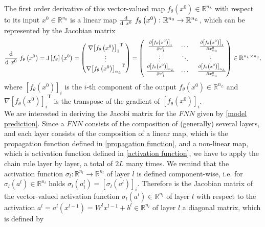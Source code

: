The first order derivative of this vector-valued map $f_{\theta}\left(x^0\right) \in \mathbb{R}^{n_L}$ with respect to its input $x^0 \in \mathbb{R}^{n_0}$ is a linear map $\frac{\textup{d}}{\textup{d} \ x^0} \  f_{\theta}\left(x^0\right) \colon \mathbb{R}^{n_0} \to \mathbb{R}^{n_L}$, which can be represented by the Jacobian matrix
\begin{equation}
    \label{Jacobi}
    \frac{\textup{d}}{\textup{d} \ x^0} \  f_{\theta}\left(x^0\right) = \mathrm{J} \left[f_{\theta} \right]\left(x^0\right) = \begin{pmatrix} \nabla {\left[f_{\theta}\left(x^0\right)\right]_{1}}^{\mathrm{T}} \\ \vdots \\  \nabla {\left[f_{\theta}\left(x^0\right)\right]_{n_L}}^{\mathrm{T}} \end{pmatrix} = \begin{pmatrix} \ \frac{\partial \left[f_{\theta}\left(x^0\right)\right]_1}{\partial x^0_{1}} & \cdots & \ \frac{\partial \left[f_{\theta}\left(x^0\right)\right]_1}{\partial x^0_{n_0}} \\ \vdots & \ddots & \vdots \\ \ \frac{\partial \left[f_{\theta}\left(x^0\right)\right]_{n_L}}{\partial x^0_{1}} & \cdots & \ \frac{\partial \left[f_{\theta}\left(x^0\right)\right]_{n_L}}{\partial x^0_{n_0}} \end{pmatrix} \in \mathbb{R}^{n_L \times n_0}, 
\end{equation}
where $\left[f_{\theta}\left(x^0\right)\right]_i$ is the $i$-th component of the output $f_{\theta}\left(x^0\right) \in \mathbb{R}^{n_L}$ and $\nabla {\left[f_{\theta}\left(x^0\right)\right]_i}^{\mathrm{T}}$ is the transpose of the gradient of $\left[f_{\theta}\left(x^0\right)\right]_i$. \\
We are interested in deriving the Jacobi matrix for the $FNN$ given by \cref{model prediction}. Since a $FNN$ consists of the composition of (generally) several layers, and each layer consists of the composition of a linear map, which is the propagation function defined in \cref{propagation function}, and a non-linear map, which is activation function defined in \cref{activation function}, we have to apply the chain rule layer by layer, a total of $2L$ many times. We remind that the activation function $\sigma_{l} \colon \mathbb{R}^{n_l} \to \mathbb{R}^{n_l}$ of layer $l$ is defined component-wise, i.e. for $\sigma_{l}\left(a^l\right) \in \mathbb{R}^{n_l}$ holds $\sigma_{l}\left(a^l_i\right) = \left[ \sigma_{l}\left(a^l\right) \right]_i$. Therefore is the Jacobian matrix of the vector-valued activation function $\sigma_{l}\left(a^l\right) \in \mathbb{R}^{n_l}$ of layer $l$ with respect to the activation $a^l = a^l\left(x^{l-1}\right) = W^{l} x^{l-1} + b^{l} \in \mathbb{R}^{n_l}$ of layer $l$ a diagonal matrix, which is defined by
